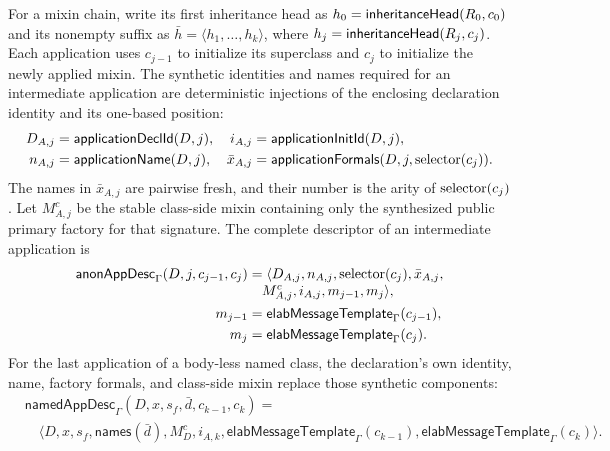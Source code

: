 For a mixin chain, write its first inheritance head as
$h_0=\mathsf{inheritanceHead}(R_0,c_0)$ and its nonempty suffix as
$\bar h=\langle h_1,\ldots,h_k\rangle$, where
$h_j=\mathsf{inheritanceHead}(R_j,c_j)$.  Each application uses $c_{j-1}$ to
initialize its superclass and $c_j$ to initialize the newly applied mixin.
The synthetic identities and names required for an intermediate application
are deterministic injections of the enclosing declaration identity and its
one-based position:
\begin{equation}\label{eq:front-end-application-identities}
\begin{aligned}
 D_{A,j}&=\mathsf{applicationDeclId}(D,j),&
 i_{A,j}&=\mathsf{applicationInitId}(D,j),\\
 n_{A,j}&=\mathsf{applicationName}(D,j),&
 \bar x_{A,j}&=\mathsf{applicationFormals}(D,j,\mathop{\mathrm{selector}}(c_j)).
\end{aligned}
\end{equation}
The names in $\bar x_{A,j}$ are pairwise fresh, and their number is the arity
of $\mathop{\mathrm{selector}}(c_j)$.  Let $M^c_{A,j}$ be the stable class-side mixin containing
only the synthesized public primary factory for that signature.  The complete
descriptor of an intermediate application is
\begin{equation}\label{eq:front-end-anonymous-application-descriptor}
\begin{aligned}
 \mathsf{anonAppDesc}_{\Gamma}(D,j,c_{j-1},c_j)
   &=\langle D_{A,j},n_{A,j},\mathop{\mathrm{selector}}(c_j),\bar x_{A,j},\\[-1mm]
   &\quad M^c_{A,j},i_{A,j},m_{j-1},m_j\rangle,\\
 m_{j-1}&=\mathsf{elabMessageTemplate}_{\Gamma}(c_{j-1}),\\
 m_j&=\mathsf{elabMessageTemplate}_{\Gamma}(c_j).
\end{aligned}
\end{equation}
For the last application of a body-less named class, the declaration's own
identity, name, factory formals, and class-side mixin replace those synthetic
components:
\begin{equation}\label{eq:front-end-named-application-descriptor}
\begin{aligned}
 &\mathsf{namedAppDesc}_{\Gamma}
   (D,x,s_f,\bar d,c_{k-1},c_k)={}\\
 &\quad\langle D,x,s_f,\mathsf{names}(\bar d),M_D^c,i_{A,k},
   \mathsf{elabMessageTemplate}_{\Gamma}(c_{k-1}),
   \mathsf{elabMessageTemplate}_{\Gamma}(c_k)\rangle.
\end{aligned}
\end{equation}
